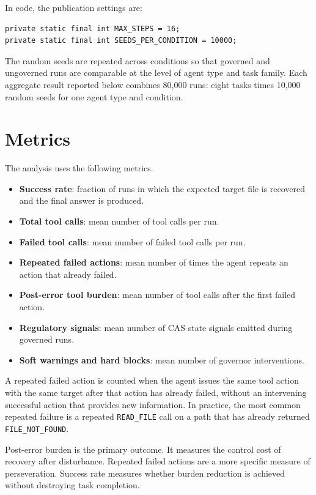 \documentclass[11pt]{article}
\begin{document}
In code, the publication settings are:

\begin{verbatim}
private static final int MAX_STEPS = 16;
private static final int SEEDS_PER_CONDITION = 10000;
\end{verbatim}

The random seeds are repeated across conditions so that governed and ungoverned runs are comparable at the level of agent type and task family. Each aggregate result reported below combines 80,000 runs: eight tasks times 10,000 random seeds for one agent type and condition.

\section{Metrics}

The analysis uses the following metrics.

\begin{itemize}[leftmargin=1.5em]
    \item \textbf{Success rate}: fraction of runs in which the expected target file is recovered and the final answer is produced.
    \item \textbf{Total tool calls}: mean number of tool calls per run.
    \item \textbf{Failed tool calls}: mean number of failed tool calls per run.
    \item \textbf{Repeated failed actions}: mean number of times the agent repeats an action that already failed.
    \item \textbf{Post-error tool burden}: mean number of tool calls after the first failed action.
    \item \textbf{Regulatory signals}: mean number of CAS state signals emitted during governed runs.
    \item \textbf{Soft warnings and hard blocks}: mean number of governor interventions.
\end{itemize}

A repeated failed action is counted when the agent issues the same tool action with the same target after that action has already failed, without an intervening successful action that provides new information. In practice, the most common repeated failure is a repeated \texttt{READ\_FILE} call on a path that has already returned \texttt{FILE\_NOT\_FOUND}.

Post-error burden is the primary outcome. It measures the control cost of recovery after disturbance. Repeated failed actions are a more specific measure of perseveration. Success rate measures whether burden reduction is achieved without destroying task completion.
\end{document}
